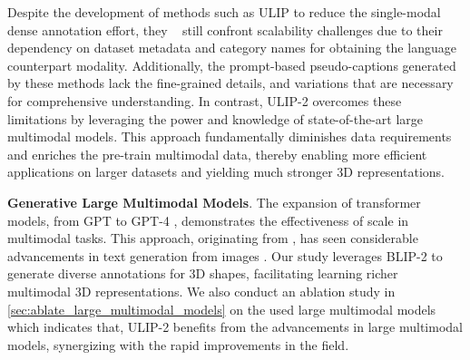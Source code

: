 \documentclass[10pt,twocolumn,letterpaper]{article}
\newcommand{\ning}[1]{\textcolor{blue}{Ning: #1}}
\begin{document}

Despite the development of methods such as ULIP to reduce the single-modal dense annotation effort, they ~\citep{xue2022ulip,qi2023contrast,liu2023openshape} still confront scalability challenges due to their dependency on dataset metadata and category names for obtaining the language counterpart modality. Additionally, the prompt-based pseudo-captions generated by these methods lack the fine-grained details, and variations that are necessary for comprehensive understanding. In contrast, ULIP-2 overcomes these limitations by leveraging the power and knowledge of state-of-the-art large multimodal models. This approach fundamentally diminishes data requirements and enriches the pre-train multimodal data, thereby enabling more efficient applications on larger datasets and yielding much stronger 3D representations.

\noindent\textbf{Generative Large Multimodal Models}. The expansion of transformer models, from GPT to GPT-4 \cite{vaswani2017attention,openai2023gpt4}, demonstrates the effectiveness of scale in multimodal tasks. This approach, originating from \cite{anderson2018bottom}, has seen considerable advancements in text generation from images \cite{lu2018neural, zhou2019grounded, zhou2020unified, cho2021unifying, wang2021simvlm, li2021align, li2020unimo, li2022blip, li2023blip}. Our study leverages BLIP-2 \cite{li2022blip} to generate diverse annotations for 3D shapes, facilitating learning richer multimodal 3D representations. We also conduct an ablation study in \ref{sec:ablate_large_multimodal_models} on the used large multimodal models which indicates that, ULIP-2 benefits from the advancements in large multimodal models, synergizing with the rapid improvements in the field.

         
\end{document}
